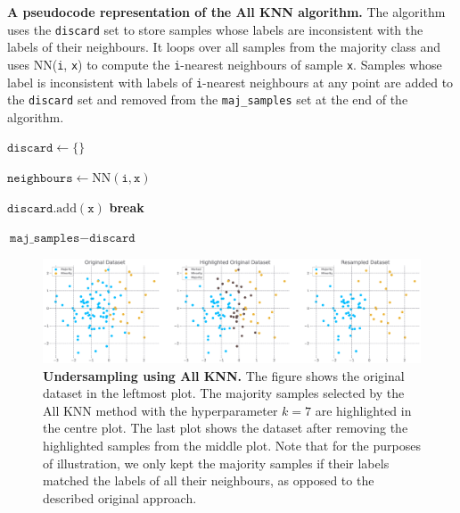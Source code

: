 \begin{algorithm}
    \caption{
        \textbf{A pseudocode representation of the All KNN algorithm.} The algorithm uses the
        \texttt{discard} set to store samples whose labels are inconsistent with the labels of
        their neighbours. It loops over all samples from the majority class and uses
        \textrm{NN}(\texttt{i}, \texttt{x}) to compute the \texttt{i}-nearest neighbours of sample
        \texttt{x}. Samples whose label is inconsistent with labels of \texttt{i}-nearest
        neighbours at any point are added to the \texttt{discard} set and removed from the
        \texttt{maj\_samples} set at the end of the algorithm.
    }
    \label{algorithm:all-knn}

    \begin{algorithmic}
            \State $\texttt{discard} \gets \{\}$

                    \State $\texttt{neighbours} \gets \textrm{NN}(\texttt{i}, \texttt{x})$

                        \State $\texttt{discard}.\textrm{add}(\texttt{x})$
                        \State \textbf{break}
                    \EndIf
                \EndFor
            \EndFor

            \State \Return $\texttt{maj\_samples} - \texttt{discard}$
        \EndFunction
    \end{algorithmic}
\end{algorithm}

\begin{figure}
    \centering
    \includegraphics[width=\linewidth]{figures/all_knn.eps}
    \caption{
        \textbf{Undersampling using All KNN.} The figure shows the original dataset in the leftmost
        plot. The majority samples selected by the All KNN method with the hyperparameter $k = 7$
        are highlighted in the centre plot. The last plot shows the dataset after removing the
        highlighted samples from the middle plot. Note that for the purposes of illustration, we
        only kept the majority samples if their labels matched the labels of all their neighbours,
        as opposed to the described original approach.
    }
    \label{figure:all-knn}
\end{figure}


